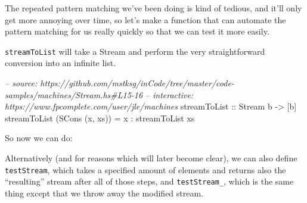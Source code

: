 \documentclass[]{article}
\newenvironment{Shaded}{\begin{snugshade}}{\end{snugshade}}
\newcommand{\CommentTok}[1]{\textcolor[rgb]{0.56,0.35,0.01}{\textit{#1}}}
\newcommand{\DataTypeTok}[1]{\textcolor[rgb]{0.13,0.29,0.53}{#1}}
\newcommand{\DecValTok}[1]{\textcolor[rgb]{0.00,0.00,0.81}{#1}}
\newcommand{\FunctionTok}[1]{\textcolor[rgb]{0.00,0.00,0.00}{#1}}
\newcommand{\NormalTok}[1]{#1}
\newcommand{\OtherTok}[1]{\textcolor[rgb]{0.56,0.35,0.01}{#1}}
\begin{document}
The repeated pattern matching we've been doing is kind of tedious, and it'll
only get more annoying over time, so let's make a function that can automate the
pattern matching for us really quickly so that we can test it more easily.

\texttt{streamToList} will take a Stream and perform the very straightforward
conversion into an infinite list.

\begin{Shaded}
\begin{Highlighting}[]
\CommentTok{-- source: https://github.com/mstksg/inCode/tree/master/code-samples/machines/Stream.hs#L15-16}
\CommentTok{-- interactive: https://www.fpcomplete.com/user/jle/machines}
\OtherTok{streamToList ::} \DataTypeTok{Stream}\NormalTok{ b }\OtherTok{->}\NormalTok{ [b]}
\NormalTok{streamToList (}\DataTypeTok{SCons}\NormalTok{ (x, xs)) }\FunctionTok{=}\NormalTok{ x }\FunctionTok{:}\NormalTok{ streamToList xs}
\end{Highlighting}
\end{Shaded}

So now we can do:

\begin{Shaded}
\end{Shaded}

Alternatively (and for reasons which will later become clear), we can also
define \texttt{testStream}, which takes a specified amount of elements and
returns also the ``resulting'' stream after all of those steps, and
\texttt{testStream\_}, which is the same thing except that we throw away the
modified stream.
\end{document}
